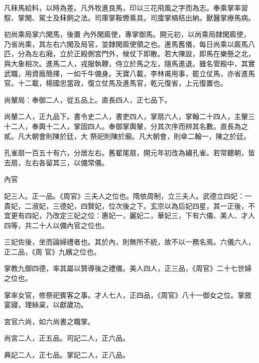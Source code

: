\begin{pinyinscope}
 凡秣馬給料，以時為差。凡外牧進良馬，印以三花飛風之字而為志。奉乘掌率習馭、掌閑、駕士及秣飼之法。司庫掌鞍轡乘具。司廩掌槁秸出納。獸醫掌療馬病。



 初尚乘局掌六閑馬，後置
 內外閑廄使，專掌御馬。開元初，以尚乘局隸閑廄使，乃省尚乘，其左右六閑及局官，並隸閑廄使領之也。進馬舊儀，每日尚乘以廄馬八匹，分為左右廂，立於正殿側宮門外，候仗下即散。若大陳設，即馬在樂懸之北，與大象相次。進馬二人，戎服執鞭，侍立於馬之左，隨馬進退。雖名管殿中，其實武職，用資廕簡擇，一如千牛備身。天寶八載，李林甫用事，罷立仗馬，亦省進馬官。十二載，楊國忠當政，復立仗馬及進馬官，乾元復省，上元復置也。



 尚輦局：奉御二人，從五品上。直長四人，正七品下。



 尚輦二人，正九品下。書令史二人，書吏四人，掌扇六人，掌翰二十四人，主輦三十二人，奉輿十二人，掌固四人。奉御掌輿輦，分其次序而辨其名數。直長為之貳。凡大朝會則陳於廷，大
 祭祀則陳於廟。凡大朝會，則傘二翰一，陳之於廷。



 孔雀扇一百五十有六，分居左右。舊翟尾扇，開元年初改為繡孔雀。若常聽朝，皆去扇，左右各留其三，以備常儀。



 內官



 妃三人。正一品。《周官》三夫人之位也。隋依周制，立三夫人。武德立四妃：一貴妃，二淑妃，三德妃，四賢妃，位次後之下。玄宗以為后妃四星，其一正後，不宜更有四妃，乃改定三妃之位：惠妃一，麗妃二，華妃三，下有六儀、美人、才人四等，共二十人以備內官之位也。



 三妃佐後，坐而論婦禮者也。其於內，則無所不統，故不以一務名焉。六儀六人，正二品，《周
 官》九嬪之位也。



 掌教九御四德，率其屬以贊導後之禮儀。美人四人，正三品，《周官》二十七世婦之位也。



 掌率女官，修祭祀賓客之事。才人七人，正四品，《周官》八十一御女之位。掌敘宴寢，理絲枲，以獻歲功。



 宮官六尚，如六尚書之職掌。



 尚宮二人，正五品。司記二人，正六品。



 典記二人，正七品。掌記二人，正八品。




\end{pinyinscope}
